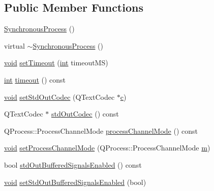 \subsection*{Public Member Functions}
\begin{DoxyCompactItemize}
\item 
\hyperlink{class_utils_1_1_synchronous_process_a1ad1fb5d4ed654d6b935da607a51b75a}{Synchronous\-Process} ()
\item 
virtual \hyperlink{class_utils_1_1_synchronous_process_a3d8f54e636d04ba52260597a64083f59}{$\sim$\-Synchronous\-Process} ()
\item 
\hyperlink{group___u_a_v_objects_plugin_ga444cf2ff3f0ecbe028adce838d373f5c}{void} \hyperlink{class_utils_1_1_synchronous_process_a669414ec72605e9f1e830e01f558593f}{set\-Timeout} (\hyperlink{ioapi_8h_a787fa3cf048117ba7123753c1e74fcd6}{int} timeout\-M\-S)
\item 
\hyperlink{ioapi_8h_a787fa3cf048117ba7123753c1e74fcd6}{int} \hyperlink{class_utils_1_1_synchronous_process_ad196c7f93892fdd7f8b74d7e7f387fbe}{timeout} () const 
\item 
\hyperlink{group___u_a_v_objects_plugin_ga444cf2ff3f0ecbe028adce838d373f5c}{void} \hyperlink{class_utils_1_1_synchronous_process_a5588eca6d2cf9537996f9a7eb354084d}{set\-Std\-Out\-Codec} (Q\-Text\-Codec $\ast$\hyperlink{glext_8h_a1f2d7f8147412c43ba2303a56f97ee73}{c})
\item 
Q\-Text\-Codec $\ast$ \hyperlink{class_utils_1_1_synchronous_process_a5824e27f2b8741a7ff7e60968802b95e}{std\-Out\-Codec} () const 
\item 
Q\-Process\-::\-Process\-Channel\-Mode \hyperlink{class_utils_1_1_synchronous_process_aedcc86a40ce89c41e0e7172568840555}{process\-Channel\-Mode} () const 
\item 
\hyperlink{group___u_a_v_objects_plugin_ga444cf2ff3f0ecbe028adce838d373f5c}{void} \hyperlink{class_utils_1_1_synchronous_process_a4469209be90a8c4a6cc8f697efd7328c}{set\-Process\-Channel\-Mode} (Q\-Process\-::\-Process\-Channel\-Mode \hyperlink{glext_8h_af593500c283bf1a787a6f947f503a5c2}{m})
\item 
bool \hyperlink{class_utils_1_1_synchronous_process_a070364f08bbcbcb85902da3263235bc6}{std\-Out\-Buffered\-Signals\-Enabled} () const 
\item 
\hyperlink{group___u_a_v_objects_plugin_ga444cf2ff3f0ecbe028adce838d373f5c}{void} \hyperlink{class_utils_1_1_synchronous_process_a697036d9d4d71ae25f018beff36bd790}{set\-Std\-Out\-Buffered\-Signals\-Enabled} (bool)
\item 

\end{DoxyCompactItemize}
